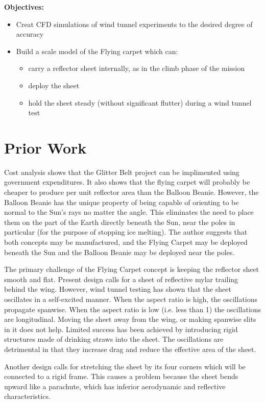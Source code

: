 \documentclass[12pt]{report} %
\begin{document}
{\bf Objectives:}
\begin{itemize}
\item Creat CFD simulations of wind tunnel experiments to the desired degree of accuracy
\item Build a scale model of the Flying carpet which can:
  \begin{itemize}
  \item carry a reflector sheet internally, as in the climb phase of the mission
  \item deploy the sheet
  \item hold the sheet steady (without significant flutter) during a wind tunnel test
  \end{itemize}
\end{itemize}

\chapter{Prior Work}

Cost analysis shows that the Glitter Belt project can be implimented using government expenditures.  It also shows that the flying carpet
will probably be cheaper to produce per unit reflector area than the Balloon Beanie.  However, the Balloon Beanie has the unique property
of being capable of orienting to be normal to the Sun's rays no matter the angle.  This eliminates the need to place them on the part of
the Earth directly beneath the Sun, near the poles in particular (for the purpose of stopping ice melting).  The author suggests that
both concepts may be manufactured, and the Flying Carpet may be deployed beneath the Sun and the Balloon Beanie may be deployed near the
poles.

The primary challenge of the Flying Carpet concept is keeping the reflector sheet smooth and flat.  Present design calls for a sheet
of reflective mylar trailing behind the wing.  However, wind tunnel testing has shown that the sheet oscillates in a self-excited manner.
 When the aspect ratio is high, the oscillations propagate spanwise.  When the aspect ratio is low (i.e. less than 1) the oscillations
are longitudinal.  Moving the sheet away from the wing, or making spanwise slits in it does not help.  Limited success has been achieved
by introducing rigid structures made of drinking straws into the sheet.  The oscillations are detrimental in that they increase drag
and reduce the effective area of the sheet.

Another design calls for stretching the sheet by its four corners which will be connected to a rigid frame.  This causes a problem because
the sheet bends upward like a parachute, which has inferior aerodynamic and reflective characteristics.
\end{document}
